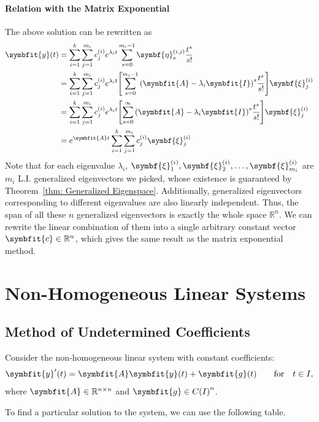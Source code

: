 \documentclass[10pt,UTF8]{article}
\newcommand{\mat}[1]{\symbfit{#1}}
\renewcommand{\vec}[1]{%
  \ifnum0\ifcat#1a1\else0\fi>0
  \symbfit{#1}  %
  \else
  \symbf{#1}  %
  \fi
}
\theoremstyle{definition}
\newtheorem{definition inner}{Definition}[section]
\theoremstyle{definition}
\newtheorem{theorem inner}{Theorem}[section]
\theoremstyle{definition}
\newtheorem*{proof inner}{\textit{Proof}}
\theoremstyle{plain}
\newtheorem{tip inner}{Tip}[section]
\theoremstyle{remark}
\begin{document}
\paragraph{Relation with the Matrix Exponential}
The above solution can be rewritten as
\begin{align*}
  \vec{y}(t)
  &= \sum_{i=1}^k \sum_{j=1}^{m_i} c^{(i)}_j e^{\lambda_i t}
  \sum_{s=0}^{m_i-1} \vec{\eta}^{(i,j)}_s \frac{t^s}{s!} \\
  &= \sum_{i=1}^k \sum_{j=1}^{m_i}
  c^{(i)}_j e^{\lambda_i t}
  \qty[ \sum_{s=0}^{m_i-1}
    {(\mat{A} - \lambda_i \mat{I})}^{s} \frac{t^s}{s!}
  ] \vec{\xi}^{(i)}_j \\
  &= \sum_{i=1}^k \sum_{j=1}^{m_i}
  c^{(i)}_j e^{\lambda_i t}
  \qty[ \sum_{s=0}^{\infty}
    {(\mat{A} - \lambda_i \mat{I})}^{s} \frac{t^s}{s!}
  ] \vec{\xi}^{(i)}_j \\
  &= e^{\mat{A} t} \sum_{i=1}^k \sum_{j=1}^{m_i}
  c^{(i)}_j \vec{\xi}^{(i)}_j
\end{align*}
Note that for each eigenvalue \(\lambda_i\),
\(\vec{\xi}^{(i)}_1, \vec{\xi}^{(i)}_2, \ldots, \vec{\xi}^{(i)}_{m_i}\)
are \(m_i\) L.I. generalized eigenvectors we picked,
whose existence is guaranteed by Theorem~\ref{thm: Generalized Eigenspace}.
Additionally, generalized eigenvectors corresponding to different eigenvalues
are also linearly independent.
Thus, the span of all these \(n\) generalized eigenvectors is
exactly the whole space \(\mathbb{R}^n\).
We can rewrite the linear combination of them into
a single arbitrary constant vector \(\vec{c} \in \mathbb{R}^n\),
which gives the same result as the matrix exponential method.

\section{Non-Homogeneous Linear Systems}

\subsection{Method of Undetermined Coefficients}

Consider the non-homogeneous linear system with constant coefficients:
\begin{equation}
  \vec{y}'(t) = \mat{A} \vec{y}(t) + \vec{g}(t) \quad \qfor t\in I,
  \label{eq: 1.nHLCC.Sys}
\end{equation}
where \(\mat{A} \in \mathbb{R}^{n \times n}\) and
\(\vec{g} \in {C(I)}^n\).

To find a particular solution to the system, we can use the following table.
\end{document}
